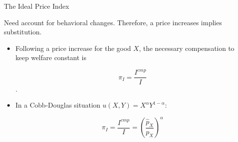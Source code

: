 \documentclass[handout]{beamer}
\begin{document}
\begin{frame}{The Ideal Price Index}

Need account for behavioral changes. Therefore, a price increases implies substitution. 

\begin{itemize}
\item Following a price increase for the good $X$, the necessary compensation to keep welfare constant is 

$$ \pi_I =  \frac{I^{cmp}}{I} $$.

\item In a Cobb-Douglas situation $u(X,Y)=X^{\alpha}Y^{1-\alpha}$: 

$$ \pi_I = \frac{I^{cmp}}{I} = \left(\frac{\hat p_X}{p_X}\right)^\alpha$$

\end{itemize}

\end{frame}
\end{document}
